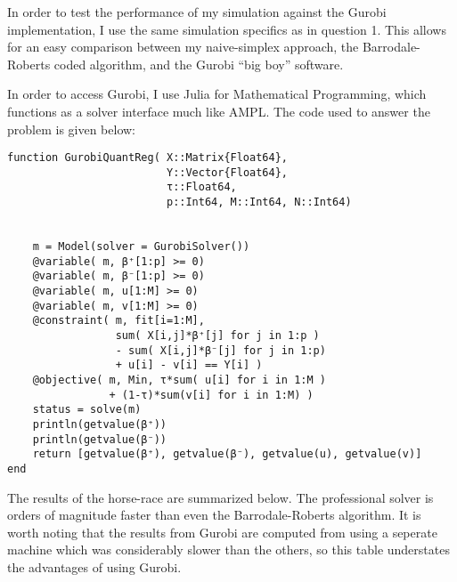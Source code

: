 \documentclass[12pt]{paper}
\begin{document}
In order to test the performance of my simulation against the Gurobi
implementation, I use the same simulation specifics as in question
1. This allows for an easy comparison between my naive-simplex
approach, the Barrodale-Roberts coded algorithm, and the Gurobi ``big
boy'' software.

In order to access Gurobi, I use Julia for Mathematical Programming,
which functions as a solver interface much like AMPL. The code used to
answer the problem is given below:

\begin{verbatim}
function GurobiQuantReg( X::Matrix{Float64},
                         Y::Vector{Float64},
                         τ::Float64,
                         p::Int64, M::Int64, N::Int64)

    
    m = Model(solver = GurobiSolver())
    @variable( m, β⁺[1:p] >= 0)
    @variable( m, β⁻[1:p] >= 0)
    @variable( m, u[1:M] >= 0)
    @variable( m, v[1:M] >= 0)
    @constraint( m, fit[i=1:M],
                 sum( X[i,j]*β⁺[j] for j in 1:p )
                 - sum( X[i,j]*β⁻[j] for j in 1:p)
                 + u[i] - v[i] == Y[i] )
    @objective( m, Min, τ*sum( u[i] for i in 1:M )
                + (1-τ)*sum(v[i] for i in 1:M) )
    status = solve(m)
    println(getvalue(β⁺))
    println(getvalue(β⁻))
    return [getvalue(β⁺), getvalue(β⁻), getvalue(u), getvalue(v)]
end
\end{verbatim}

The results of the horse-race are summarized below.
The professional solver is orders of magnitude faster than even the
Barrodale-Roberts algorithm. It is worth noting that the results from
Gurobi are computed from using a seperate machine which was
considerably slower than the others, so this table understates the
advantages of using Gurobi.
\end{document}
